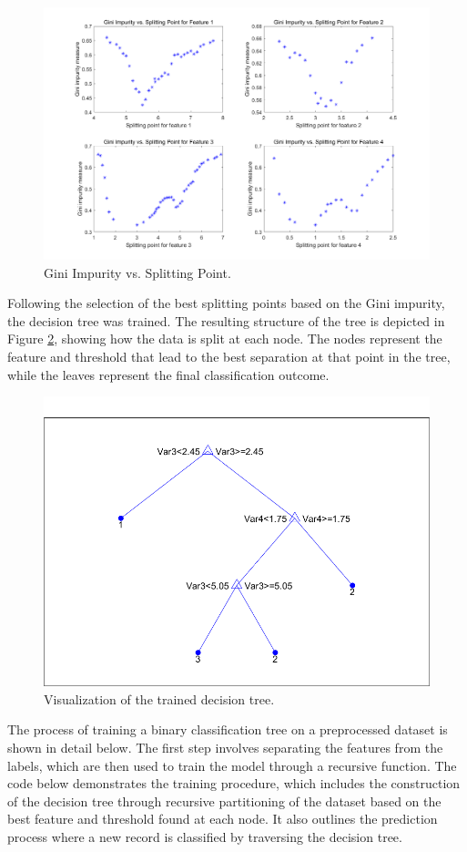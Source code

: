 \documentclass[12pt, onecolumn]{article}
\begin{document}
\begin{figure}[htbp]
\centering
\includegraphics[width=0.8\linewidth]{222.png}
\caption{Gini Impurity vs. Splitting Point.}
\label{fig:gini_impurity_4}
\end{figure}

Following the selection of the best splitting points based on the Gini impurity, the decision tree was trained. The resulting structure of the tree is depicted in Figure \ref{fig:decision_tree}, showing how the data is split at each node. The nodes represent the feature and threshold that lead to the best separation at that point in the tree, while the leaves represent the final classification outcome.

\begin{figure}[htbp]
\centering
\includegraphics[width=0.8\linewidth]{1111.png}
\caption{Visualization of the trained decision tree.}
\label{fig:decision_tree}
\end{figure}


The process of training a binary classification tree on a preprocessed dataset is shown in detail below. The first step involves separating the features from the labels, which are then used to train the model through a recursive function. The code below demonstrates the training procedure, which includes the construction of the decision tree through recursive partitioning of the dataset based on the best feature and threshold found at each node. It also outlines the prediction process where a new record is classified by traversing the decision tree.
\end{document}
